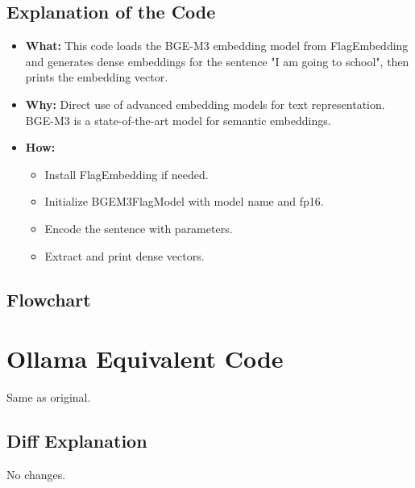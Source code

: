 \documentclass[11pt, a4paper]{article}
\begin{document}
\subsection{Explanation of the Code}
\begin{itemize}
    \item \textbf{What:} This code loads the BGE-M3 embedding model from FlagEmbedding and generates dense embeddings for the sentence "I am going to school", then prints the embedding vector.
    \item \textbf{Why:} Direct use of advanced embedding models for text representation. BGE-M3 is a state-of-the-art model for semantic embeddings.
    \item \textbf{How:}
    \begin{itemize}
        \item Install FlagEmbedding if needed.
        \item Initialize BGEM3FlagModel with model name and fp16.
        \item Encode the sentence with parameters.
        \item Extract and print dense vectors.
    \end{itemize}
\end{itemize}

\subsection{Flowchart}

\section{Ollama Equivalent Code}
Same as original.

\subsection{Diff Explanation}
No changes.
\end{document}
